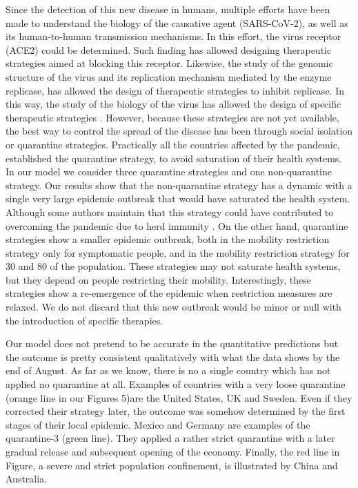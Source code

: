 \documentclass[11pt,a4paper,reqno]{amsart}
\theoremstyle{definition}
\theoremstyle{remark}
\begin{document}
Since the detection of this new disease in humans, multiple efforts have been made to understand the biology of the causative agent (SARS-CoV-2), as well as its human-to-human transmission mechanisms. In this effort, the virus receptor (ACE2) could be determined. Such finding has allowed designing therapeutic strategies aimed at blocking this receptor. Likewise, the study of the genomic structure of the virus and its replication mechanism mediated by the enzyme replicase, has allowed the design of therapeutic strategies to inhibit replicase. In this way, the study of the biology of the virus has allowed the design of specific therapeutic strategies \cite{ShioShinJean2020}. However, because these strategies are not yet available, the best way to control the spread of the disease has been through social isolation or quarantine strategies. Practically all the countries affected by the pandemic, established the quarantine strategy, to avoid saturation of their health systems. In our model we consider three quarantine strategies and one non-quarantine strategy.
Our results show that the non-quarantine strategy has a dynamic with a single very large epidemic outbreak that would have saturated the health system. Although some authors maintain that this strategy could have contributed to overcoming the pandemic due to herd immunity  \cite{HaleyERandolph2020}. On the other hand, quarantine strategies show a smaller epidemic outbreak, both in the mobility restriction strategy only for symptomatic people, and in the mobility restriction strategy for 30 and 80 of the population. These strategies may not saturate health systems, but they depend on people restricting their mobility. Interestingly, these strategies show a re-emergence of the epidemic when restriction measures are relaxed. We do not discard that this new outbreak would be minor or null with the introduction of specific therapies.

Our model does not pretend to be accurate in the quantitative predictions but the outcome is pretty consistent qualitatively with what the data shows by the end of August. As far as we know, there is no a single country which has not applied no quarantine at all. Examples of countries with a very loose quarantine (orange line in our Figures 5)are the United States, UK and Sweden. Even if they corrected their strategy later, the outcome was somehow determined by the first stages of their local epidemic. Mexico and Germany are examples of the quarantine-3 (green line). They applied a rather strict quarantine with a later gradual release and subsequent opening of the economy. Finally, the red line in Figure, a severe and strict population confinement, is illustrated by China and Australia.
\end{document}
